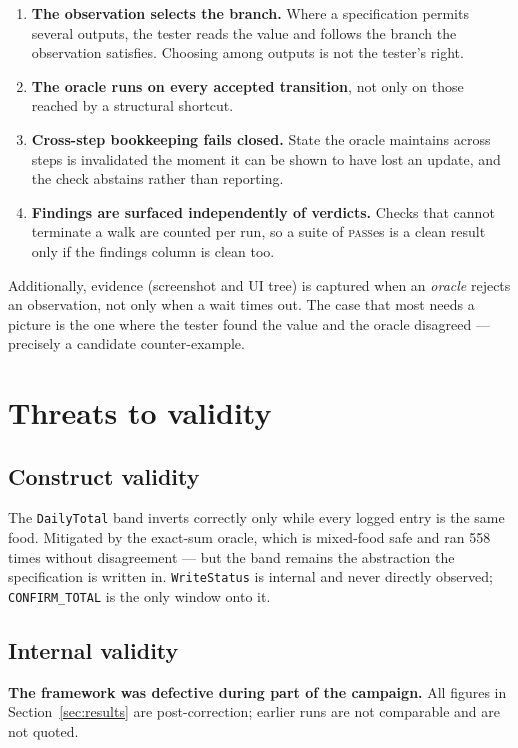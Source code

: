 \documentclass[11pt,a4paper]{article}
\newcommand{\gate}[1]{\texttt{\small #1}}
\begin{document}
\begin{enumerate}\setlength\itemsep{2pt}
  \item \textbf{The observation selects the branch.} Where a specification permits
  several outputs, the tester reads the value and follows the branch the
  observation satisfies. Choosing among outputs is not the tester's right.
  \item \textbf{The oracle runs on every accepted transition}, not only on those
  reached by a structural shortcut.
  \item \textbf{Cross-step bookkeeping fails closed.} State the oracle maintains
  across steps is invalidated the moment it can be shown to have lost an update,
  and the check abstains rather than reporting.
  \item \textbf{Findings are surfaced independently of verdicts.} Checks that
  cannot terminate a walk are counted per run, so a suite of \textsc{pass}es is a
  clean result only if the findings column is clean too.
\end{enumerate}

\noindent Additionally, evidence (screenshot and UI tree) is captured when an
\emph{oracle} rejects an observation, not only when a wait times out. The case that
most needs a picture is the one where the tester found the value and the oracle
disagreed --- precisely a candidate counter-example.

\section{Threats to validity}
\label{sec:threats}

\subsection*{Construct validity}
The \gate{DailyTotal} band inverts correctly only while every logged entry is the
same food. Mitigated by the exact-sum oracle, which is mixed-food safe and ran 558
times without disagreement --- but the band remains the abstraction the
specification is written in. \gate{WriteStatus} is internal and never directly
observed; \gate{CONFIRM\_TOTAL} is the only window onto it.

\subsection*{Internal validity}
\textbf{The framework was defective during part of the campaign.} All figures in
Section~\ref{sec:results} are post-correction; earlier runs are not comparable and
are not quoted.
\end{document}
